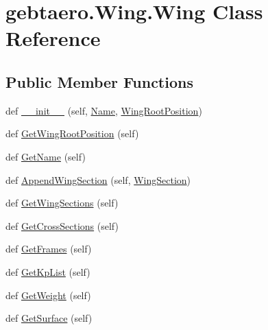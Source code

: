 \hypertarget{classgebtaero_1_1_wing_1_1_wing}{}\section{gebtaero.\+Wing.\+Wing Class Reference}
\label{classgebtaero_1_1_wing_1_1_wing}
\subsection*{Public Member Functions}
\begin{DoxyCompactItemize}
\item 
def \hyperlink{classgebtaero_1_1_wing_1_1_wing_ad4899077f16bf8b8dff5e9ce86c4b2c0}{\+\_\+\+\_\+init\+\_\+\+\_\+} (self, \hyperlink{classgebtaero_1_1_wing_1_1_wing_a1c41ea89cf72ec60090134497f1ede15}{Name}, \hyperlink{classgebtaero_1_1_wing_1_1_wing_aa0957399544603f1df3cdb3b02eeda4a}{Wing\+Root\+Position})
\item 
def \hyperlink{classgebtaero_1_1_wing_1_1_wing_a6623e4ea917c8a03a3de9bbf7110e754}{Get\+Wing\+Root\+Position} (self)
\item 
def \hyperlink{classgebtaero_1_1_wing_1_1_wing_a180f53c7c326569cc0c8e8c78a3a0b2a}{Get\+Name} (self)
\item 
def \hyperlink{classgebtaero_1_1_wing_1_1_wing_ae2bcf197a55c10900d837bc0d9d6aac7}{Append\+Wing\+Section} (self, \hyperlink{classgebtaero_1_1_wing_section_1_1_wing_section}{Wing\+Section})
\item 
def \hyperlink{classgebtaero_1_1_wing_1_1_wing_a9fbfa35745a94279f37ebf497a36126e}{Get\+Wing\+Sections} (self)
\item 
def \hyperlink{classgebtaero_1_1_wing_1_1_wing_a15245b467e6be2a7ace9a917e67661ff}{Get\+Cross\+Sections} (self)
\item 
def \hyperlink{classgebtaero_1_1_wing_1_1_wing_a0bd0def91e16cd1a19b10fcdf8c50e41}{Get\+Frames} (self)
\item 
def \hyperlink{classgebtaero_1_1_wing_1_1_wing_afe768db8f9a06bd5784143c1168a5acc}{Get\+Kp\+List} (self)
\item 
def \hyperlink{classgebtaero_1_1_wing_1_1_wing_a290d5e1d3a18de515339ffbed0f0df35}{Get\+Weight} (self)
\item 
def \hyperlink{classgebtaero_1_1_wing_1_1_wing_af0be9af67eb300ebc83262025f6c80af}{Get\+Surface} (self)
\end{DoxyCompactItemize}
